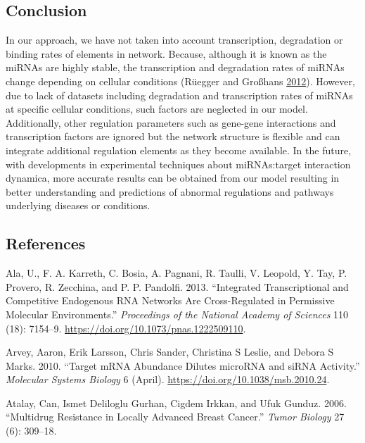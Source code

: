 \documentclass[a4,center,fleqn]{NAR}
\begin{document}
\hypertarget{conclusion}{%
\subsection{Conclusion}\label{conclusion}}

In our approach, we have not taken into account transcription,
degradation or binding rates of elements in network. Because, although
it is known as the miRNAs are highly stable, the transcription and
degradation rates of miRNAs change depending on cellular conditions
(Rüegger and Großhans
\protect\hyperlink{ref-ruegger_microrna_2012}{2012}). However, due to
lack of datasets including degradation and transcription rates of miRNAs
at specific cellular conditions, such factors are neglected in our
model. Additionally, other regulation parameters such as gene-gene
interactions and transcription factors are ignored but the network
structure is flexible and can integrate additional regulation elements
as they become available. In the future, with developments in
experimental techniques about miRNAs:target interaction dynamica, more
accurate results can be obtained from our model resulting in better
understanding and predictions of abnormal regulations and pathways
underlying diseases or conditions.

\hypertarget{references}{%
\subsection*{References}\label{references}}

\hypertarget{refs}{}
\leavevmode\hypertarget{ref-ala_integrated_2013}{}%
Ala, U., F. A. Karreth, C. Bosia, A. Pagnani, R. Taulli, V. Leopold, Y.
Tay, P. Provero, R. Zecchina, and P. P. Pandolfi. 2013. ``Integrated
Transcriptional and Competitive Endogenous RNA Networks Are
Cross-Regulated in Permissive Molecular Environments.''
\emph{Proceedings of the National Academy of Sciences} 110 (18):
7154--9. \url{https://doi.org/10.1073/pnas.1222509110}.

\leavevmode\hypertarget{ref-arvey_target_2010}{}%
Arvey, Aaron, Erik Larsson, Chris Sander, Christina S Leslie, and Debora
S Marks. 2010. ``Target mRNA Abundance Dilutes microRNA and siRNA
Activity.'' \emph{Molecular Systems Biology} 6 (April).
\url{https://doi.org/10.1038/msb.2010.24}.

\leavevmode\hypertarget{ref-atalay2006multidrug}{}%
Atalay, Can, Ismet Deliloglu Gurhan, Cigdem Irkkan, and Ufuk Gunduz.
2006. ``Multidrug Resistance in Locally Advanced Breast Cancer.''
\emph{Tumor Biology} 27 (6): 309--18.
\end{document}
